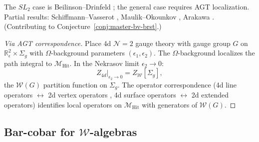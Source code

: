 \begin{remark}[Scope]
The $SL_2$ case is Beilinson--Drinfeld \cite{BD04}; the general case requires AGT localization.  Partial results: Schiffmann--Vasserot \cite{SV13}, Maulik--Okounkov \cite{MO19}, Arakawa \cite{Ara07}.
(Contributing to Conjecture~\ref{conj:master-bv-brst}.)
\end{remark}

\begin{proof}[Via AGT correspondence]
Place 4d $\mathcal{N}=2$ gauge theory with gauge group $G$ on $\mathbb{R}^2_\epsilon \times \Sigma_g$ with $\Omega$-background parameters $(\epsilon_1, \epsilon_2)$.  The $\Omega$-background localizes the path integral to $\mathcal{M}_{\mathrm{Hit}}$.  In the Nekrasov limit $\epsilon_2 \to 0$:
\[Z_{4d}|_{\epsilon_2 \to 0} = Z_{\mathcal{W}}[\Sigma_g],\]
the $\mathcal{W}(G)$ partition function on $\Sigma_g$.  The operator correspondence (4d line operators $\leftrightarrow$ 2d vertex operators \cite{DNP25}, 4d surface operators $\leftrightarrow$ 2d extended operators) identifies local operators on $\mathcal{M}_{\mathrm{Hit}}$ with generators of $\mathcal{W}(G)$.
\end{proof}

\subsection{Bar-cobar for $\mathcal{W}$-algebras}

